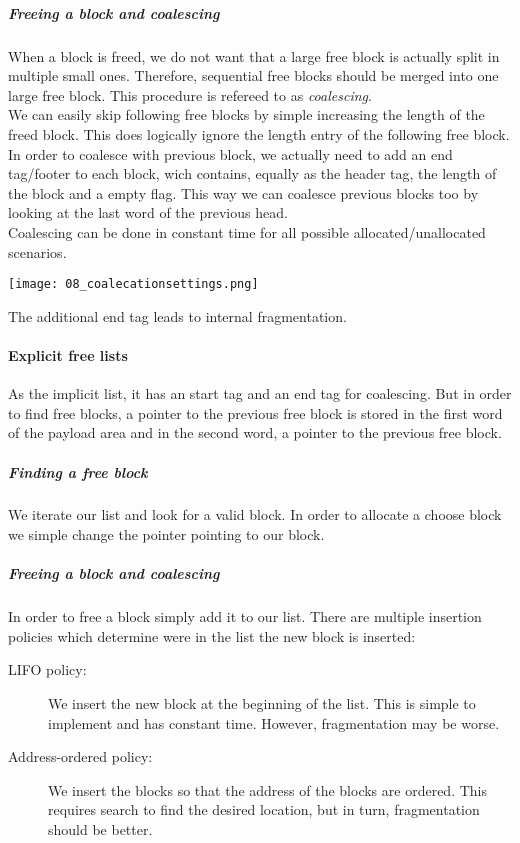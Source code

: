 \subparagraph{Freeing a block and coalescing}
When a block is freed, we do not want that a large free block is actually split in multiple small ones. Therefore, sequential free blocks should be merged into one large free block. This procedure is refereed to as \textit{coalescing}.\\
We can easily skip following free blocks by simple increasing the length of the freed block. This does logically ignore the length entry of the following free block.\\
In order to coalesce with previous block, we actually need to add an end tag/footer to each block, wich contains, equally as the header tag, the length of the block and a empty flag. This way we can coalesce previous blocks too by looking at the last word of the previous head.\\
Coalescing can be done in constant time for all possible allocated/unallocated scenarios.

\texttt{[image: 08\_coalecationsettings.png]}

The additional end tag leads to internal fragmentation. 

\paragraph{Explicit free lists}
As the implicit list, it has an start tag and an end tag for coalescing. But in order to find free blocks, a pointer to the previous free block is stored in the first word of the payload area and in the second word, a pointer to the previous free block.

\subparagraph{Finding a free block}
We iterate our list and look for a valid block. In order to allocate a choose block we simple change the pointer pointing to our block.

\subparagraph{Freeing a block and coalescing}
In order to free a block simply add it to our list. There are multiple insertion policies which determine were in the list the new block is inserted:

\begin{description}
    \item[LIFO policy:] We insert the new block at the beginning of the list. This is simple to implement and has constant time. However, fragmentation may be worse.
    \item[Address-ordered policy:] We insert the blocks so that the address of the blocks are ordered. This requires search to find the desired location, but in turn, fragmentation should be better.
\end{description}

